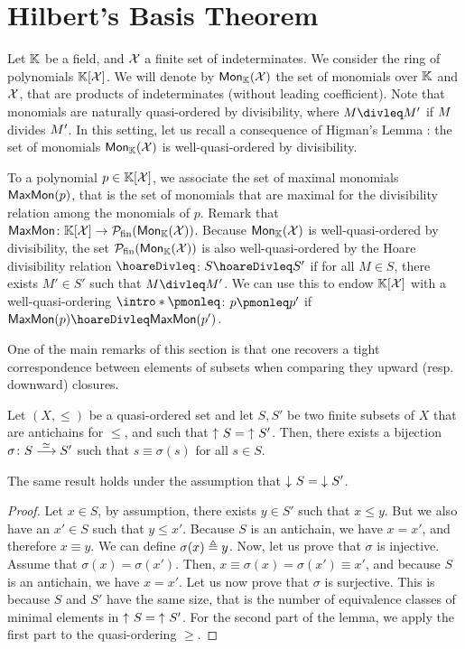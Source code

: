\section{Hilbert's Basis Theorem}
\label{sec:hilbert}

Let $\mathbb{K}$ be a field, and $\mathcal{X}$ a finite set of indeterminates. We
consider the ring of polynomials $\Poly{\Indets}$. We will denote by
$\Mon{\Indets}$ the set of monomials over $\mathbb{K}$ and $\mathcal{X}$, that are
products of indeterminates (without leading coefficient). Note that monomials
are naturally quasi-ordered by divisibility, where $\mon \divleq \mon'$ if
$\mon$ divides $\mon'$. In this setting, let us recall a consequence of
Higman's Lemma \cite{HIG52}: the set of monomials $\Mon{\Indets}$ is
well-quasi-ordered by divisibility.

To a polynomial $p \in \Poly{\Indets}$, we associate the set of maximal
monomials $\mathsf{MaxMon}(p)$, that is the set of monomials that are maximal for the
divisibility relation among the monomials of $p$. Remark that $\MaxMon \colon
\Poly{\Indets} \to \Pfin(\Mon{\Indets})$. Because $\Mon{\Indets}$ is
well-quasi-ordered by divisibility, the set $\Pfin(\Mon{\Indets})$ is also
well-quasi-ordered by the Hoare divisibility relation $\hoareDivleq$: $S \hoareDivleq
S'$ if for all $M \in S$, there exists $M' \in S'$ such that $M \divleq M'$.
We can use this to endow $\Poly{\Indets}$ with a well-quasi-ordering $\intro*\pmonleq$:
$p \pmonleq p'$ if $\MaxMon(p) \hoareDivleq \MaxMon(p')$.

One of the main remarks of this section is that one recovers a tight
correspondence between elements of subsets when comparing they upward (resp.
downward) closures.

\begin{lemma}
    \label{lem:antichain-bijection}
    Let $(X,\leq)$ be a quasi-ordered set
    and let $S, S'$ be two finite subsets of $X$
    that are antichains for $\leq$,
    and such that $\upset{S} = \upset{S'}$.
    Then, there exists a bijection $\sigma \colon S \stackrel{\simeq}{\longrightarrow} S'$
    such that $s \equiv \sigma(s)$ for all $s \in S$.

    The same result holds under the assumption that
    $\dwset{S} = \dwset{S'}$.
\end{lemma}
\begin{proof}
    Let $x \in S$, by assumption,
    there exists $y \in S'$
    such that $x \leq y$. But we also have
    an $x' \in S$ such that $y \leq x'$.
    Because $S$ is an antichain, we have $x = x'$,
    and therefore $x \equiv y$.
    We can define $\sigma(x) \triangleq y$.
    Now, let us prove that $\sigma$ is injective.
    Assume that $\sigma(x) = \sigma(x')$.
    Then, $x \equiv \sigma(x) = \sigma(x') \equiv x'$,
    and because $S$ is an antichain, we have $x = x'$.
    Let us now prove that $\sigma$ is surjective.
    This is because $S$ and $S'$ have the same size, that is
    the number of equivalence classes of minimal elements
    in $\upset{S} = \upset{S'}$.
    For the second part of the lemma, we apply
    the first part to the quasi-ordering $\geq$.
\end{proof}



